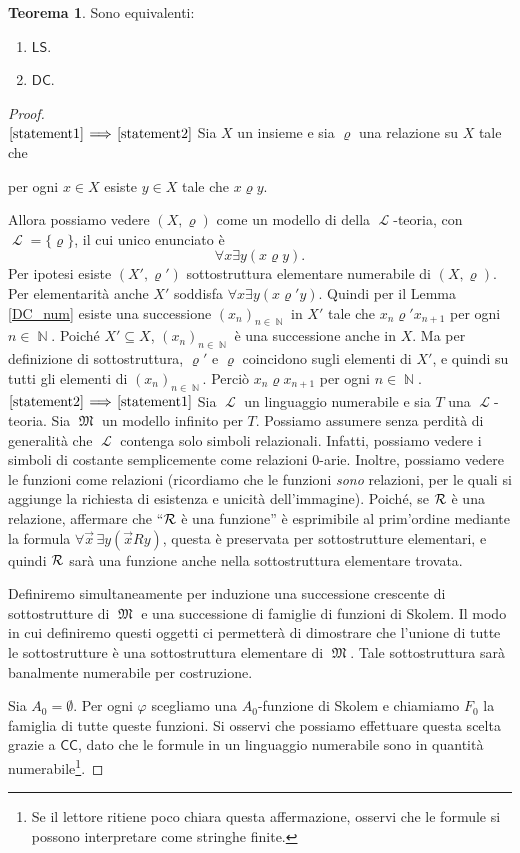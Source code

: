 \documentclass[12pt,a4paper]{report}
\theoremstyle{definition}
\newtheorem{teo}{Teorema}[section]  %
\theoremstyle{num.custom-title}
\DeclareMathOperator{\LL}{\mathcal{L}}
\DeclareMathOperator{\N}{\mathbb{N}}
\DeclareMathOperator{\M}{\mathfrak{M}}
\DeclareMathOperator{\sse}{\subseteq}
\newcommand{\CC}{\ensuremath{\mathsf{CC}}\xspace}
\newcommand{\DC}{\ensuremath{\mathsf{DC}}\xspace}
\newcommand{\LS}{\ensuremath{\mathsf{LS}}\xspace}
\renewcommand{\phi}{\varphi}
\newcommand{\Implies}[2]{$\text{\ref{statement#1}}\!\implies\!\text{\ref{statement#2}}$}%
\newcommand{\punto}[1]{\item \label{statement#1}}
\newenvironment{equivalence}
    {\begin{enumerate}[label=(\arabic*),ref=(\arabic*)]
    }
    { 
	\end{enumerate}
    }
\begin{document}
\begin{teo} Sono equivalenti:
\begin{equivalence}
\punto{1} \LS.
\punto{2} \DC.
\end{equivalence}
\begin{proof}\ \\
\Implies{1}{2} Sia $X$ un insieme e sia $\varrho$ una relazione su $X$ tale che 
\begin{center}
per ogni $x \in X$ esiste $y \in X$ tale che $x \varrho y$.
\end{center}
Allora possiamo vedere $(X,\varrho)$ come un modello di della $\LL$-teoria, con $\LL=\{\varrho\}$, il cui unico enunciato è 
\[
\forall x \exists y (x \varrho y).
\]
Per ipotesi esiste $(X',\varrho')$ sottostruttura elementare numerabile di $(X,\varrho)$. Per elementarità anche $X'$ soddisfa $\forall x \exists y (x \varrho' y)$. Quindi per il Lemma \ref{DC_num} esiste una successione $(x_n)_{n \in \N}$ in $X'$ tale che $x_n \varrho' x_{n+1}$ per ogni $n \in \N$. Poiché $X' \sse X$, $(x_n)_{n \in \N}$ è una successione anche in $X$. Ma per definizione di sottostruttura, $\varrho'$ e $\varrho$ coincidono sugli elementi di $X'$, e quindi su tutti gli elementi di $(x_n)_{n \in \N}$. Perciò $x_n \varrho x_{n+1}$ per ogni $n \in \N$.\\
\Implies{2}{1} Sia $\LL$ un linguaggio numerabile e sia $T$ una $\LL$-teoria. Sia $\M$ un modello infinito per $T$. Possiamo assumere senza perdità di generalità che $\LL$ contenga solo simboli relazionali. Infatti, possiamo vedere i simboli di costante semplicemente come relazioni $0$-arie. Inoltre, possiamo vedere le funzioni come relazioni (ricordiamo che le funzioni \emph{sono} relazioni, per le quali si aggiunge la richiesta di esistenza e unicità dell'immagine). Poiché, se $\cal R$ è una relazione, affermare che ``$\cal R$ è una funzione'' è esprimibile al prim'ordine mediante la formula $\forall \vec x \, \exists y (\vec x R y)$, questa è preservata per sottostrutture elementari, e quindi $\cal R$ sarà una funzione anche nella sottostruttura elementare trovata.

Definiremo simultaneamente per induzione una successione crescente di sottostrutture di $\M$ e una successione di famiglie di funzioni di Skolem. Il modo in cui definiremo questi oggetti ci permetterà di dimostrare che l'unione di tutte le sottostrutture è una sottostruttura elementare di $\M$. Tale sottostruttura sarà banalmente numerabile per costruzione.

Sia $A_0= \emptyset$. Per ogni $\phi$ scegliamo una $A_0$-funzione di Skolem e chiamiamo $F_0$ la famiglia di tutte queste funzioni. Si osservi che possiamo effettuare questa scelta grazie a \CC, dato che le formule in un linguaggio numerabile sono in quantità numerabile\footnote{Se il lettore ritiene poco chiara questa affermazione, osservi che le formule si possono interpretare come stringhe finite.}. 


\end{proof}
\end{teo}
\end{document}
